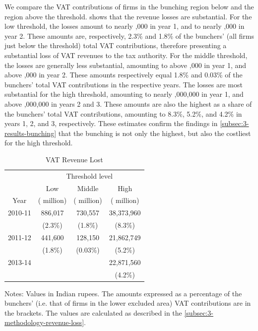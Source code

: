 We compare the VAT contributions of firms in the bunching region below and the region above the threshold.  shows that the revenue losses are substantial. For the low threshold, the losses amount to nearly ,000 in year 1, and to nearly ,000 in year 2. These amounts are, respectively, 2.3\% and 1.8\% of the bunchers' (all firms just below the threshold) total VAT contributions, therefore presenting a substantial loss of VAT revenues to the tax authority. For the middle threshold, the losses are generally less substantial, amounting to above ,000 in year 1, and above ,000 in year 2. These amounts respectively equal 1.8\% and 0.03\% of the bunchers' total VAT contributions in the respective years. The losses are most substantial for the high threshold, amounting to nearly ,000,000 in year 1, and above ,000,000 in years 2 and 3. These amounts are also the highest as a share of the bunchers' total VAT contributions, amounting to 8.3\%, 5.2\%,
and 4.2\% in years 1, 2, and 3, respectively. These estimates confirm the findings in \cref{subsec:3-results-bunching} that the bunching is not only the highest, but also the costliest for the high threshold.

\begin{table}[t]
  \begin{threeparttable}
    \caption{VAT Revenue Lost}
    \label{tab:VAT-revenue-lost}
    \begin{tabular}{cccc}
      \hline 
      & \multicolumn{3}{c}{Threshold level}\\
       & Low   & Middle   & High \\ %
      Year  & (\rupee1 million)  & (\rupee5 million)  & (\rupee50 million)\tabularnewline
      \hline 
      2010-11  & 886,017  & 730,557   & 38,373,960  \tabularnewline
       & (2.3\%)  & (1.8\%)  & (8.3\%)\tabularnewline
      2011-12  & 441,600   & 128,150   & 21,862,749 \tabularnewline
       & (1.8\%)  & (0.03\%)  & (5.2\%)\tabularnewline
      2013-14  &  &  & 22,871,560\tabularnewline
       &  &  & (4.2\%)\tabularnewline
      \hline 
	\end{tabular}
	\begin{tablenotes}[para]
		Notes: Values in Indian rupees. The amounts expressed as a percentage of the bunchers' (i.e. that of firms in the lower excluded area) VAT contributions are in the brackets. The values are calculated as described in the \cref{subsec:3-methodology-revenue-loss}.
	\end{tablenotes}
  \end{threeparttable}
\end{table}


